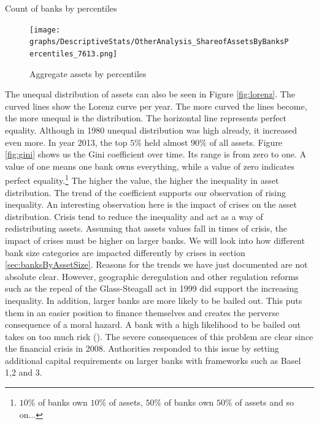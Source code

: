 \documentclass[12pt, a4paper]{article} %
\begin{document}
\begin{table}[H]
\begin{minipage}{\textwidth}
\scriptsize

\caption[1]{Count of banks by percentiles}
\label{table:assetsByPercentiles}
\end{minipage}
\end{table}

\begin{figure}[H]
\texttt{[image: graphs/DescriptiveStats/OtherAnalysis\_ShareofAssetsByBanksPercentiles\_7613.png]}
\centering
\caption{Aggregate assets by percentiles}
\label{fig:assetsByPercentiles}
\end{figure}


The unequal distribution of assets can also be seen in Figure \ref{fig:lorenz}. The curved lines show the Lorenz curve per year. The more curved the lines become, the more unequal is the distribution. The horizontal line represents perfect equality. Although in 1980 unequal distribution was high already, it increased even more. In year 2013, the top $5\%$ held almost $90\%$ of all assets. Figure \ref{fig:gini} shows us the Gini coefficient over time. Its range is from zero to one. A value of one means one bank owns everything, while a value of zero indicates perfect equality.\footnote{$10\%$ of banks own $10\%$ of assets, $50\%$ of banks own $50\%$ of assets and so on...} The higher the value, the higher the inequality in asset distribution. The trend of the coefficient supports our observation of rising inequality. An interesting observation here is the impact of crises on the asset distribution. Crisis tend to reduce the inequality and act as a way of redistributing assets. Assuming that assets values fall in times of crisis, the impact of crises must be higher on larger banks. We will look into how different bank size categories are impacted differently by crises in section \ref{sec:banksByAssetSize}.
Reasons for the trends we have just documented are not absolute clear. However, geographic deregulation and other regulation reforms such as the repeal of the Glass-Steagall act in 1999 did support the increasing inequality. In addition, larger banks are more likely to be bailed out. This puts them in an easier position to finance themselves and creates the perverse consequence of a moral hazard. A bank with a high likelihood to be bailed out takes on too much risk (\citet{FarhiTirole2012}). The severe consequences of this problem are clear since the financial crisis in 2008. Authorities responded to this issue by setting additional capital requirements on larger banks with frameworks such as Basel 1,2 and 3. 
\end{document}
